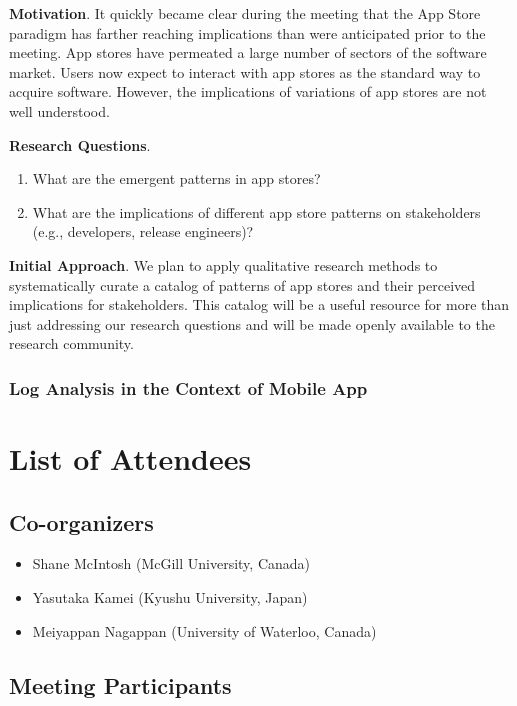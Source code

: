 \documentclass[a4paper]{article}
\newcommand{\smallsection}[1]{\noindent \textbf{#1}. }
\begin{document}
\smallsection{Motivation}
It quickly became clear during the meeting that the App Store paradigm has farther reaching implications than were anticipated prior to the meeting.
App stores have permeated a large number of sectors of the software market.
Users now expect to interact with app stores as the standard way to acquire software.
However, the implications of variations of app stores are not well understood.

\smallsection{Research Questions}

\begin{enumerate}[\bfseries RQ1]
	\item What are the emergent patterns in app stores?
	\item What are the implications of different app store patterns on stakeholders (e.g., developers, release engineers)?
\end{enumerate}

\smallsection{Initial Approach}
We plan to apply qualitative research methods to systematically curate a catalog of patterns of app stores and their perceived implications for stakeholders. This catalog will be a useful resource for more than just addressing our research questions and will be made openly available to the research community.

\subsubsection{Log Analysis in the Context of Mobile App}

\clearpage

\section{List of Attendees}

\subsection{Co-organizers}

\begin{itemize}
\item Shane McIntosh (McGill University, Canada)
\item Yasutaka Kamei (Kyushu University, Japan)
\item Meiyappan Nagappan (University of Waterloo, Canada)
\end{itemize}

\subsection{Meeting Participants}
\end{document}
